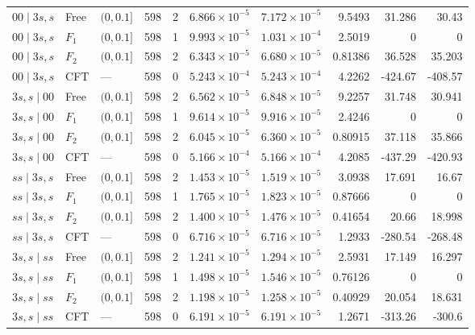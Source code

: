 \begin{longtable}{lllrrrrrrr}
$00\mid 3s,s$ & Free & $(0,0.1]$ & 598 & 2 & $6.866\!\times\!10^{-5}$ & $7.172\!\times\!10^{-5}$ & 9.5493 & 31.286 & 30.43\\*
$00\mid 3s,s$ & $F_1$ & $(0,0.1]$ & 598 & 1 & $9.993\!\times\!10^{-5}$ & $1.031\!\times\!10^{-4}$ & 2.5019 & 0 & 0\\*
$00\mid 3s,s$ & $F_2$ & $(0,0.1]$ & 598 & 2 & $6.343\!\times\!10^{-5}$ & $6.680\!\times\!10^{-5}$ & 0.81386 & 36.528 & 35.203\\*
$00\mid 3s,s$ & CFT & --- & 598 & 0 & $5.243\!\times\!10^{-4}$ & $5.243\!\times\!10^{-4}$ & 4.2262 & -424.67 & -408.57\\
\midrule
$3s,s\mid 00$ & Free & $(0,0.1]$ & 598 & 2 & $6.562\!\times\!10^{-5}$ & $6.848\!\times\!10^{-5}$ & 9.2257 & 31.748 & 30.941\\*
$3s,s\mid 00$ & $F_1$ & $(0,0.1]$ & 598 & 1 & $9.614\!\times\!10^{-5}$ & $9.916\!\times\!10^{-5}$ & 2.4246 & 0 & 0\\*
$3s,s\mid 00$ & $F_2$ & $(0,0.1]$ & 598 & 2 & $6.045\!\times\!10^{-5}$ & $6.360\!\times\!10^{-5}$ & 0.80915 & 37.118 & 35.866\\*
$3s,s\mid 00$ & CFT & --- & 598 & 0 & $5.166\!\times\!10^{-4}$ & $5.166\!\times\!10^{-4}$ & 4.2085 & -437.29 & -420.93\\
\midrule
$ss\mid 3s,s$ & Free & $(0,0.1]$ & 598 & 2 & $1.453\!\times\!10^{-5}$ & $1.519\!\times\!10^{-5}$ & 3.0938 & 17.691 & 16.67\\*
$ss\mid 3s,s$ & $F_1$ & $(0,0.1]$ & 598 & 1 & $1.765\!\times\!10^{-5}$ & $1.823\!\times\!10^{-5}$ & 0.87666 & 0 & 0\\*
$ss\mid 3s,s$ & $F_2$ & $(0,0.1]$ & 598 & 2 & $1.400\!\times\!10^{-5}$ & $1.476\!\times\!10^{-5}$ & 0.41654 & 20.66 & 18.998\\*
$ss\mid 3s,s$ & CFT & --- & 598 & 0 & $6.716\!\times\!10^{-5}$ & $6.716\!\times\!10^{-5}$ & 1.2933 & -280.54 & -268.48\\
\midrule
$3s,s\mid ss$ & Free & $(0,0.1]$ & 598 & 2 & $1.241\!\times\!10^{-5}$ & $1.294\!\times\!10^{-5}$ & 2.5931 & 17.149 & 16.297\\*
$3s,s\mid ss$ & $F_1$ & $(0,0.1]$ & 598 & 1 & $1.498\!\times\!10^{-5}$ & $1.546\!\times\!10^{-5}$ & 0.76126 & 0 & 0\\*
$3s,s\mid ss$ & $F_2$ & $(0,0.1]$ & 598 & 2 & $1.198\!\times\!10^{-5}$ & $1.258\!\times\!10^{-5}$ & 0.40929 & 20.054 & 18.631\\*
$3s,s\mid ss$ & CFT & --- & 598 & 0 & $6.191\!\times\!10^{-5}$ & $6.191\!\times\!10^{-5}$ & 1.2671 & -313.26 & -300.6\\
\end{longtable}
\endgroup
